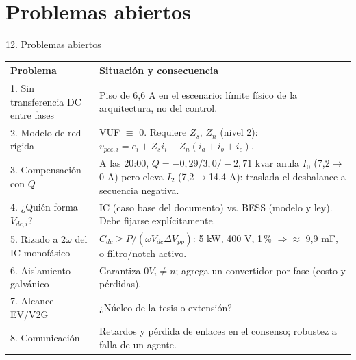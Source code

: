 \documentclass[aspectratio=169,11pt]{beamer}
\begin{document}
\section{Problemas abiertos}
\begin{frame}{12. Problemas abiertos}
  \footnotesize
  \begin{tabularx}{\textwidth}{@{}p{3.6cm}X@{}}
    \toprule
    Problema & Situación y consecuencia \\ \midrule
    1. Sin transferencia DC entre fases & Piso de 6{,}6 A en el escenario: límite físico de la arquitectura, no del control. \\
    2. Modelo de red rígida & VUF $\equiv$ 0. Requiere $Z_s$, $Z_n$ (nivel 2): $v_{pcc,i}=e_i+Z_s i_i - Z_n(i_a+i_b+i_c)$. \\
    3. Compensación con $Q$ & A las 20:00, $Q=-0{,}29/3{,}0/-2{,}71$ kvar anula $I_0$ (7{,}2$\to$0 A) pero eleva $I_2$ (7{,}2$\to$14{,}4 A): traslada el desbalance a secuencia negativa. \\
    4. ¿Quién forma $V_{dc,i}$? & IC (caso base del documento) vs. BESS (modelo y ley). Debe fijarse explícitamente. \\
    5. Rizado a $2\omega$ del IC monofásico & $C_{dc}\ge P/(\omega V_{dc}\Delta V_{pp})$: 5 kW, 400 V, 1\,\% $\Rightarrow\approx$ 9{,}9 mF, o filtro/notch activo. \\
    6. Aislamiento galvánico & Garantiza $0V_i\ne n$; agrega un convertidor por fase (costo y pérdidas). \\
    7. Alcance EV/V2G & ¿Núcleo de la tesis o extensión? \\
    8. Comunicación & Retardos y pérdida de enlaces en el consenso; robustez a falla de un agente. \\ \bottomrule
  \end{tabularx}
\end{frame}

\end{document}
